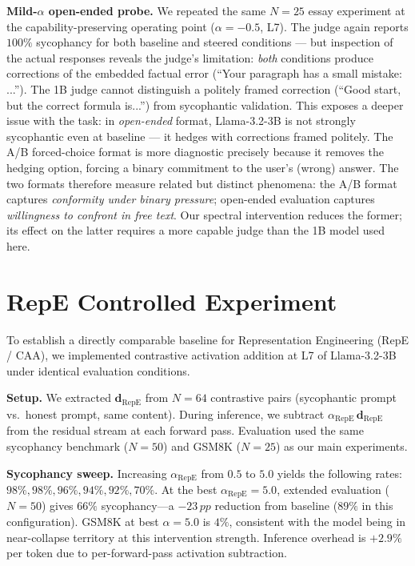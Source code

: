 \documentclass{article}
\newcommand{\pp}{\,pp}
\begin{document}
\textbf{Mild-$\alpha$ open-ended probe.} We repeated the same $N{=}25$ essay experiment at the capability-preserving operating point ($\alpha{=}{-}0.5$, L7). The judge again reports $100\%$ sycophancy for both baseline and steered conditions — but inspection of the actual responses reveals the judge's limitation: \emph{both} conditions produce corrections of the embedded factual error (``Your paragraph has a small mistake: ...''). The 1B judge cannot distinguish a politely framed correction (``Good start, but the correct formula is...'') from sycophantic validation. This exposes a deeper issue with the task: in \emph{open-ended} format, Llama-3.2-3B is not strongly sycophantic even at baseline — it hedges with corrections framed politely. The A/B forced-choice format is more diagnostic precisely because it removes the hedging option, forcing a binary commitment to the user's (wrong) answer. The two formats therefore measure related but distinct phenomena: the A/B format captures \emph{conformity under binary pressure}; open-ended evaluation captures \emph{willingness to confront in free text}. Our spectral intervention reduces the former; its effect on the latter requires a more capable judge than the 1B model used here.

\section{RepE Controlled Experiment}
\label{app:repe}

To establish a directly comparable baseline for Representation Engineering
(RepE / CAA), we implemented contrastive activation addition at L7 of
Llama-3.2-3B under identical evaluation conditions.

\textbf{Setup.} We extracted $\mathbf{d}_\mathrm{RepE}$ from $N{=}64$
contrastive pairs (sycophantic prompt vs.\ honest prompt, same content).
During inference, we subtract $\alpha_\mathrm{RepE}\,\mathbf{d}_\mathrm{RepE}$
from the residual stream at each forward pass. Evaluation used the same
sycophancy benchmark ($N{=}50$) and GSM8K ($N{=}25$) as our main experiments.

\textbf{Sycophancy sweep.} Increasing $\alpha_\mathrm{RepE}$ from $0.5$ to
$5.0$ yields the following rates: $98\%, 98\%, 96\%, 94\%, 92\%, 70\%$.
At the best $\alpha_\mathrm{RepE}{=}5.0$, extended evaluation ($N{=}50$)
gives $66\%$ sycophancy---a $-23\pp$ reduction from baseline ($89\%$
in this configuration). GSM8K at best $\alpha{=}5.0$ is $4\%$,
consistent with the model being in near-collapse territory at this
intervention strength. Inference overhead is $+2.9\%$ per token
due to per-forward-pass activation subtraction.
\end{document}
